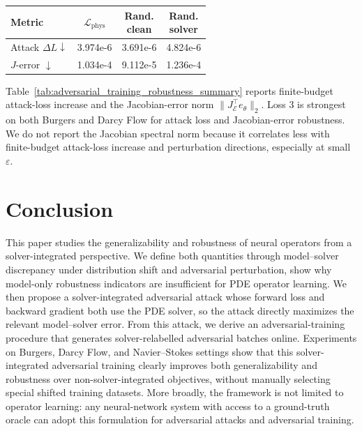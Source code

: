 \documentclass[letterpaper]{article} %
\newcommand{\tabref}[1]{Table~\ref{#1}}
\begin{document}
\begin{table}[t]
\vspace{0.05em}
\begin{tabular}{@{}lccc@{}}
\toprule
Metric & \(\mathcal L_{\mathrm{phys}}\) &
\shortstack{Rand.\\clean} & \shortstack{Rand.\\solver} \\
\midrule
Attack \(\Delta L\downarrow\) & 3.974e-6 & 3.691e-6 & 4.824e-6 \\
\(J\)-error \(\downarrow\) & 1.034e-4 & 9.112e-5 & 1.236e-4 \\
\bottomrule
\end{tabular}
\end{table}

\tabref{tab:adversarial_training_robustness_summary} reports finite-budget
attack-loss increase and the Jacobian-error norm
\(\|J_{\mathcal E}^{\top}e_\theta\|_2\). Loss 3 is strongest on both Burgers
and Darcy Flow for attack loss and Jacobian-error robustness. We do not report
the Jacobian spectral norm because it correlates less with finite-budget
attack-loss increase and perturbation directions, especially at small
\(\varepsilon\).

\section{Conclusion}

This paper studies the generalizability and robustness of neural operators from
a solver-integrated perspective. We define both quantities through
model--solver discrepancy under distribution shift and adversarial
perturbation, show why model-only robustness indicators are insufficient for PDE
operator learning. We then propose a solver-integrated adversarial attack whose
forward loss and backward gradient both use the PDE solver, so the attack
directly maximizes the relevant model--solver error. From this attack, we derive
an adversarial-training procedure that generates solver-relabelled adversarial
batches online. Experiments on Burgers, Darcy Flow, and Navier--Stokes
settings show that this solver-integrated adversarial training clearly improves
both generalizability and robustness over non-solver-integrated objectives,
without manually selecting special shifted training datasets.
More broadly, the framework is not limited to operator learning: any
neural-network system with access to a ground-truth oracle can adopt this
formulation for adversarial attacks and adversarial training.
\end{document}
